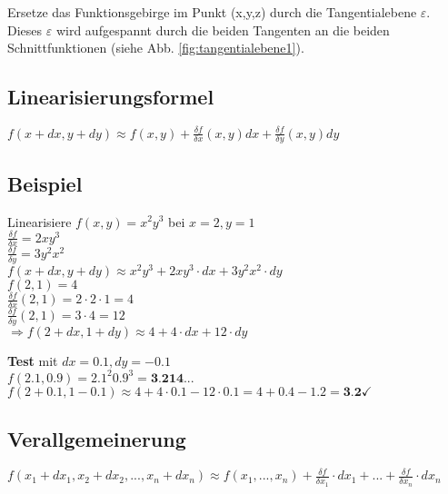 Ersetze das Funktionsgebirge im Punkt (x,y,z) durch die Tangentialebene $\varepsilon$. Dieses $\varepsilon$ wird aufgespannt durch die beiden Tangenten an die beiden Schnittfunktionen (siehe Abb. \ref{fig:tangentialebene1}). 


\subsection{Linearisierungsformel}
$ f(x+dx, y+dy) \approx f(x,y) + \frac{\delta f}{\delta x} (x,y) dx + \frac{\delta f}{\delta y} (x,y) dy $


\subsection{Beispiel} Linearisiere $f(x,y)=x^2 y^3$ bei $x=2,y=1$\\
$ \frac{\delta f}{\delta x} = 2x y^3$\\
$ \frac{\delta f}{\delta y} = 3y^2 x^2$\\
$ f(x+dx, y+dy) \approx x^2 y^3 + 2xy^3 \cdot dx + 3y^2x^2 \cdot dy $\\
$ f(2,1) = 4 $\\
$ \frac{\delta f}{\delta x} (2,1) = 2 \cdot 2 \cdot 1 = 4$\\
$ \frac{\delta f}{\delta y} (2,1) = 3 \cdot 4 = 12$\\
$ \Rightarrow f(2+dx,1+dy) \approx 4+4 \cdot dx+12 \cdot dy$

\textbf{Test} mit $dx=0.1, dy=-0.1$\\
$ f(2.1, 0.9) = 2.1^2 0.9^3 = \textbf{3.214...}$\\
$ f(2+0.1, 1-0.1) \approx 4+4 \cdot 0.1-12\cdot 0.1 = 4+0.4-1.2=\textbf{3.2} \checkmark $

\subsection{Verallgemeinerung} 
$ f(x_1+dx_1, x_2+dx_2,..., x_n+dx_n) \approx f(x_1,...,x_n) + \frac{\delta f}{\delta x_1} \cdot dx_1 + ... + \frac{\delta f}{\delta x_n} \cdot dx_n$